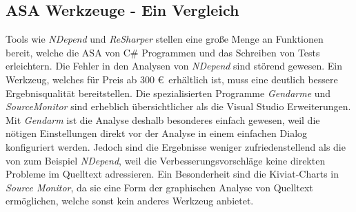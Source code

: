 \subsection{ASA Werkzeuge - Ein Vergleich}
Tools wie \emph{NDepend} und \emph{ReSharper} stellen eine große Menge an Funktionen bereit, welche die ASA von C\# Programmen und das Schreiben von Tests erleichtern. Die Fehler in den Analysen von \emph{NDepend} sind störend gewesen. Ein Werkzeug, welches für Preis ab 300 \euro ~erhältlich ist, muss eine deutlich bessere Ergebnisqualität bereitstellen. Die spezialisierten Programme \emph{Gendarme} und \emph{SourceMonitor} sind erheblich übersichtlicher als die Visual Studio Erweiterungen. Mit \emph{Gendarm} ist die Analyse deshalb besonderes einfach gewesen, weil die nötigen Einstellungen direkt vor der Analyse in einem einfachen Dialog konfiguriert werden. Jedoch sind die Ergebnisse weniger zufriedenstellend als die von zum Beispiel \emph{NDepend}, weil die Verbesserungsvorschläge keine direkten Probleme im Quelltext adressieren. Ein Besonderheit sind die Kiviat-Charts in \emph{Source Monitor}, da sie eine Form der graphischen Analyse von Quelltext ermöglichen, welche sonst kein anderes Werkzeug anbietet.
